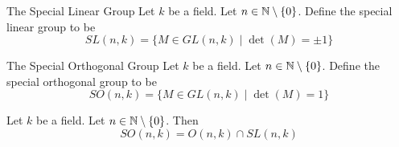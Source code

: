 \documentclass[a4paper]{article}
\begin{document}
\begin{defn}{The Special Linear Group}{} Let $k$ be a field. Let $n\in\mathbb{N}\setminus\{0\}$. Define the special linear group to be $$SL(n,k)=\{M\in GL(n,k)\;|\;\det(M)=\pm1\}$$
\end{defn}

\begin{defn}{The Special Orthogonal Group}{} Let $k$ be a field. Let $n\in\mathbb{N}\setminus\{0\}$. Define the special orthogonal group to be $$SO(n,k)=\{M\in GL(n,k)\;|\;\det(M)=1\}$$
\end{defn}

\begin{lmm}{}{} Let $k$ be a field. Let $n\in\mathbb{N}\setminus\{0\}$. Then $$SO(n,k)=O(n,k)\cap SL(n,k)$$
\end{lmm}
\end{document}
